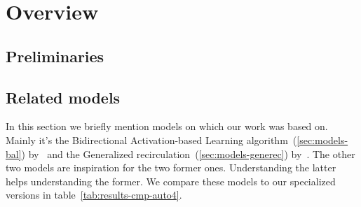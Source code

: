 



\section{Overview}
\label{sec:overview} 

\subsection{Preliminaries}
\label{sec:theory} 

 



\subsection{Related models}
\label{sec:overview-models}  

In this section we briefly mention models on which our work was based on. Mainly it's the Bidirectional Activation-based Learning algorithm~(\ref{sec:models-bal}) by~\citet{farkas2013bal} and the Generalized recirculation~(\ref{sec:models-generec}) by~\citet{o1996bio}. The other two models are inspiration for the two former ones. Understanding the latter helps understanding the former. We compare these models to our specialized versions in table~\ref{tab:results-cmp-auto4}. 










 
